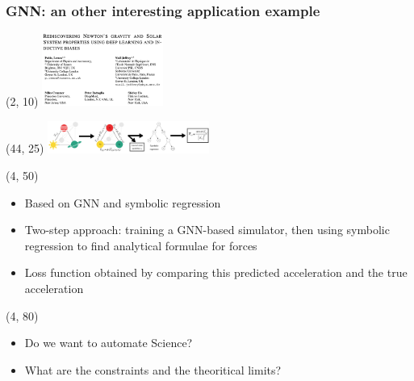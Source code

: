 \begin{frame}
  \frametitle{GNN: an other interesting application example}
  \begin{textblock}{40}(2, 10)
    \includegraphics[width=150px]{img/retrieve_gravitation_laws_1.png}
  \end{textblock}
  \begin{textblock}{56}(44, 25)
    \includegraphics[width=200px]{img/retrieve_gravitation_laws_2.png}
  \end{textblock}
  \begin{textblock}{80}(4, 50)
    \begin{itemize}
      \item Based on GNN and symbolic regression
      \item Two-step approach: training a GNN-based simulator, then using symbolic regression to find analytical formulae for forces
      \item Loss function obtained by comparing this predicted acceleration and the true acceleration
    \end{itemize}
  \end{textblock}


  \begin{textblock}{80}(4, 80)
    \begin{itemize}
      \item Do we want to automate Science? 
      \item What are the constraints and the theoritical limits? 
    \end{itemize}
  \end{textblock}

\end{frame}


